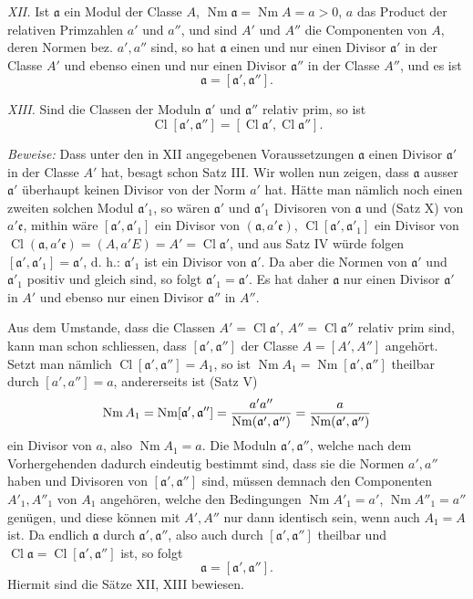 \documentclass[11pt,a4paper]{article}
\newcommand{\Cl}{\operatorname{Cl}}
\newcommand{\Nm}{\operatorname{Nm}}
\begin{document}
\emph{XII.} Ist $\mathfrak a$ ein Modul der Classe $A$, $\Nm\mathfrak a=\Nm A=a>0$, $a$ das Product der relativen Primzahlen $a'$ und $a''$, und sind $A'$ und $A''$ die Componenten von $A$, deren Normen bez. $a',a''$ sind, so hat $\mathfrak a$ einen und nur einen Divisor $\mathfrak a'$ in der Classe $A'$ und ebenso einen und nur einen Divisor $\mathfrak a''$ in der Classe $A''$, und es ist
\[
 \mathfrak a=[\mathfrak a',\mathfrak a''].
\]

\emph{XIII.} Sind die Classen der Moduln $\mathfrak a'$ und $\mathfrak a''$ relativ prim, so ist
\[
 \Cl[\mathfrak a',\mathfrak a'']=[\Cl\mathfrak a',\Cl\mathfrak a''].
\]

\emph{Beweise:} Dass unter den in XII angegebenen Voraussetzungen $\mathfrak a$ einen Divisor $\mathfrak a'$ in der Classe $A'$ hat, besagt schon Satz III. Wir wollen nun zeigen, dass $\mathfrak a$ ausser $\mathfrak a'$ überhaupt keinen Divisor von der Norm $a'$ hat. Hätte man nämlich noch einen zweiten solchen Modul $\mathfrak a'_1$, so wären $\mathfrak a'$ und $\mathfrak a'_1$ Divisoren von $\mathfrak a$ und (Satz X) von $a'\mathfrak e$, mithin wäre $[\mathfrak a',\mathfrak a'_1]$ ein Divisor von $(\mathfrak a,a'\mathfrak e)$, $\Cl[\mathfrak a',\mathfrak a'_1]$ ein Divisor von $\Cl(\mathfrak a,a'\mathfrak e)=(A,a'E)=A'=\Cl\mathfrak a'$, und aus Satz IV würde folgen $[\mathfrak a',\mathfrak a'_1]=\mathfrak a'$, d. h.: $\mathfrak a'_1$ ist ein Divisor von $\mathfrak a'$. Da aber die Normen von $\mathfrak a'$ und $\mathfrak a'_1$ positiv und gleich sind, so folgt $\mathfrak a'_1=\mathfrak a'$. Es hat daher $\mathfrak a$ nur einen Divisor $\mathfrak a'$ in $A'$ und ebenso nur einen Divisor $\mathfrak a''$ in $A''$.

Aus dem Umstande, dass die Classen $A'=\Cl\mathfrak a'$, $A''=\Cl\mathfrak a''$ relativ prim sind, kann man schon schliessen, dass $[\mathfrak a',\mathfrak a'']$ der Classe $A=[A',A'']$ angehört. Setzt man nämlich $\Cl[\mathfrak a',\mathfrak a'']=A_1$, so ist $\Nm A_1=\Nm[\mathfrak a',\mathfrak a'']$ theilbar durch $[a',a'']=a$, andererseits ist (Satz V)
\[
 \Nm A_1=\Nm[\mathfrak a',\mathfrak a'']
 ={a'a''\over \Nm(\mathfrak a',\mathfrak a'')}
 ={a\over \Nm(\mathfrak a',\mathfrak a'')}
\]
ein Divisor von $a$, also $\Nm A_1=a$. Die Moduln $\mathfrak a',\mathfrak a''$, welche nach dem Vorhergehenden dadurch eindeutig bestimmt sind, dass sie die Normen $a',a''$ haben und Divisoren von $[\mathfrak a',\mathfrak a'']$ sind, müssen demnach den Componenten $A'_1,A''_1$ von $A_1$ angehören, welche den Bedingungen $\Nm A'_1=a'$, $\Nm A''_1=a''$ genügen, und diese können mit $A',A''$ nur dann identisch sein, wenn auch $A_1=A$ ist. Da endlich $\mathfrak a$ durch $\mathfrak a',\mathfrak a''$, also auch durch $[\mathfrak a',\mathfrak a'']$ theilbar und $\Cl\mathfrak a=\Cl[\mathfrak a',\mathfrak a'']$ ist, so folgt
\[
 \mathfrak a=[\mathfrak a',\mathfrak a''].
\]
Hiermit sind die Sätze XII, XIII bewiesen.
\end{document}
